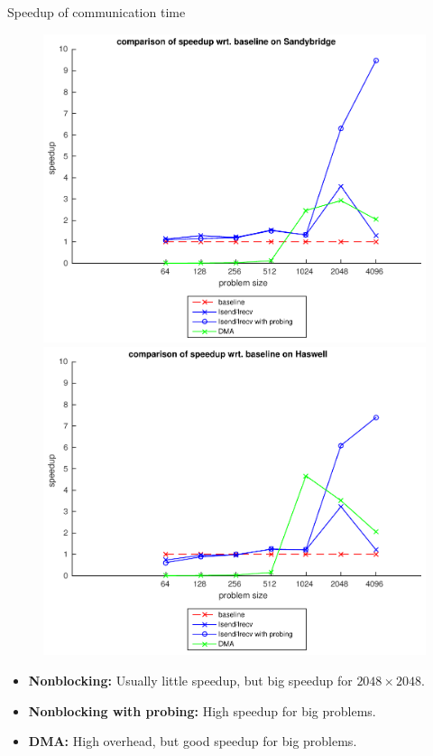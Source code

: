 \documentclass[9pt,pdftex]{beamer}
\begin{document}
\begin{frame}{Speedup of communication time}
\begin{figure}
\includegraphics[width=.5\textwidth]{Pictures/comparisonSB}
\hfill
\includegraphics[width=.5\textwidth]{Pictures/comparisonHW}
\end{figure}
\begin{itemize}
\item \textbf{Nonblocking:} Usually little speedup, but big speedup for $2048\times2048$.
\item \textbf{Nonblocking with probing:} High speedup for big problems.
\item \textbf{DMA:} High overhead, but good speedup for big problems.
\end{itemize}

\end{frame}
\end{document}
